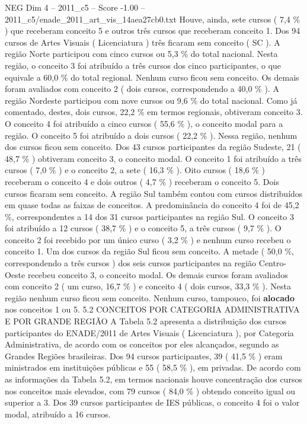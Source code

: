 \begin{textsample}{NEG Dim 4 – 2011\_c5 – Score -1.00 – 2011\_c5/enade\_2011\_art\_vis\_14aea27cb0.txt}
Houve, ainda, sete cursos ( 7,4 \% ) que receberam conceito 5 e outros três cursos que receberam conceito 1.
Dos 94 cursos de Artes Visuais ( Licenciatura ) três ficaram sem conceito ( SC ).
A região Norte participou com cinco cursos ou 5,3 \% do total nacional.
Nesta região, o conceito 3 foi atribuído a três cursos dos cinco participantes, o que equivale a 60,0 \% do total regional.
Nenhum curso ficou sem conceito.
Os demais foram avaliados com conceito 2 ( dois cursos, correspondendo a 40,0 \% ).
A região Nordeste participou com nove cursos ou 9,6 \% do total nacional.
Como já comentado, destes, dois cursos, 22,2 \% em termos regionais, obtiveram conceito 3.
O conceito 4 foi atribuído a cinco cursos ( 55,6 \% ), o conceito modal para a região.
O conceito 5 foi atribuído a dois cursos ( 22,2 \% ).
Nessa região, nenhum dos cursos ficou sem conceito.
Dos 43 cursos participantes da região Sudeste, 21 ( 48,7 \% ) obtiveram conceito 3, o conceito modal.
O conceito 1 foi atribuído a três cursos ( 7,0 \% ) e o conceito 2, a sete ( 16,3 \% ).
Oito cursos ( 18,6 \% ) receberam o conceito 4 e dois outros ( 4,7 \% ) receberam o conceito 5.
Dois cursos ficaram sem conceito.
A região Sul também contou com cursos distribuídos em quase todas as faixas de conceitos.
A predominância do conceito 4 foi de 45,2 \%, correspondentes a 14 dos 31 cursos participantes na região Sul.
O conceito 3 foi atribuído a 12 cursos ( 38,7 \% ) e o conceito 5, a três cursos ( 9,7 \% ).
O conceito 2 foi recebido por um único curso ( 3,2 \% ) e nenhum curso recebeu o conceito 1.
Um dos cursos da região Sul ficou sem conceito.
A metade ( 50,0 \%, correspondendo a três cursos ) dos seis cursos participantes na região Centro-Oeste recebeu conceito 3, o conceito modal.
Os demais cursos foram avaliados com conceito 2 ( um curso, 16,7 \% ) e conceito 4 ( dois cursos, 33,3 \% ).
Nesta região nenhum curso ficou sem conceito.
Nenhum curso, tampouco, foi \textbf{alocado} nos conceitos 1 ou 5. 5.2 CONCEITOS POR CATEGORIA ADMINISTRATIVA E POR GRANDE REGIÃO A Tabela 5.2 apresenta a distribuição dos cursos participantes do ENADE/2011 de Artes Visuais ( Licenciatura ), por Categoria Administrativa, de acordo com os conceitos por eles alcançados, segundo as Grandes Regiões brasileiras.
Dos 94 cursos participantes, 39 ( 41,5 \% ) eram ministrados em instituições públicas e 55 ( 58,5 \% ), em privadas.
De acordo com as informações da Tabela 5.2, em termos nacionais houve concentração dos cursos nos conceitos mais elevados, com 79 cursos ( 84,0 \% ) obtendo conceito igual ou superior a 3.
Dos 39 cursos participantes de IES públicas, o conceito 4 foi o valor modal, atribuído a 16 cursos.

\end{textsample}
